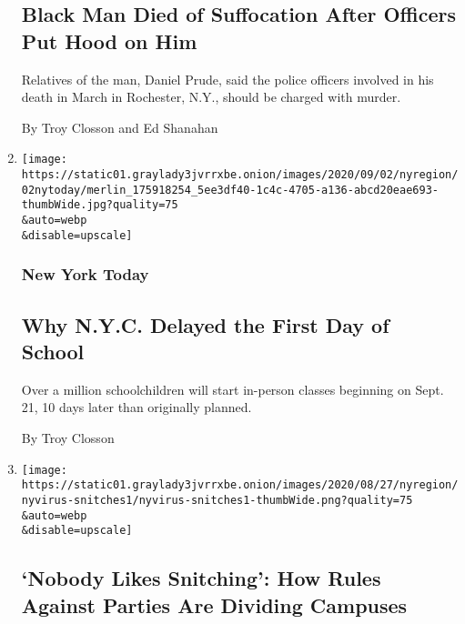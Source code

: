 \begin{enumerate}
  \hypertarget{black-man-died-of-suffocation-after-officers-put-hood-on-him}{%
  \subsection{Black Man Died of Suffocation After Officers Put Hood on
  Him}\label{black-man-died-of-suffocation-after-officers-put-hood-on-him}}

  Relatives of the man, Daniel Prude, said the police officers involved
  in his death in March in Rochester, N.Y., should be charged with
  murder.

  By Troy Closson and Ed Shanahan
\item
  \href{/2020/09/02/nyregion/schools-reopening-nyc.html}{}

  \texttt{[image: https://static01.graylady3jvrrxbe.onion/images/2020/09/02/nyregion/02nytoday/merlin\_175918254\_5ee3df40-1c4c-4705-a136-abcd20eae693-thumbWide.jpg?quality=75\\\&auto=webp\\\&disable=upscale]}

  \hypertarget{new-york-today-1}{%
  \subsubsection{New York Today}\label{new-york-today-1}}

  \hypertarget{why-nyc-delayed-the-first-day-of-school}{%
  \subsection{Why N.Y.C. Delayed the First Day of
  School}\label{why-nyc-delayed-the-first-day-of-school}}

  Over a million schoolchildren will start in-person classes beginning
  on Sept. 21, 10 days later than originally planned.

  By Troy Closson
\item
  \href{/2020/09/02/nyregion/colleges-universities-covid-parties.html}{}

  \texttt{[image: https://static01.graylady3jvrrxbe.onion/images/2020/08/27/nyregion/nyvirus-snitches1/nyvirus-snitches1-thumbWide.png?quality=75\\\&auto=webp\\\&disable=upscale]}

  \hypertarget{nobody-likes-snitching-how-rules-against-parties-are-dividing-campuses}{%
  \subsection{`Nobody Likes Snitching': How Rules Against Parties Are
  Dividing
  Campuses}\label{nobody-likes-snitching-how-rules-against-parties-are-dividing-campuses}}


\end{enumerate}
